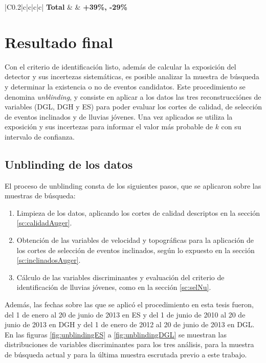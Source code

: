 \begin{table}[ht!]
\begin{tabular}{|C{0.2\textwidth}|c|c|c|c|}
		\hline
		\hline
		{\bf Total}                     &   {}  & {\bf +39\%, -29\%}         \\
		\hline
		\end{tabular}
		\caption{Resumen de las fuentes de error sistemático consideradas en este trabajo. Luego de obtener la estimación debida a cada fuebte para cada canal se combinaron utilizando la ecuación \ref{eq:sistErr03}, lo que se muestra en la última columna. Por último el error en la exposición total se obtuvo sumando en cuadratura los valores expuestos en la última columna.}
		\label{tab:sist}
	\end{table}

\chapter{Resultado final}
\label{ch:resAuger}
Con el criterio de identificaci\'on listo, adem\'as de calcular la exposici\'on del detector y sus incertezas sistem\'aticas, es posible analizar la muestra de b\'usqueda y determinar la existencia o no de eventos candidatos.
Este procedimiento se denomina \emph{unblinding}, y consiste en aplicar a los datos las tres reconstrucci\'ones de variables (DGL, DGH y ES) para poder evaluar los cortes de calidad, de selecci\'on de eventos inclinados y de lluvias j\'ovenes.
Una vez aplicados se utiliza la exposici\'on y sus incertezas para informar el valor m\'as probable de $k$ con su intervalo de confianza.
	
	\section{Unblinding de los datos}
	
	El proceso de unblinding consta de los siguientes pasos, que se aplicaron sobre las muestras de b\'usqueda:
	\begin{enumerate}
	 \item Limpieza de los datos, aplicando los cortes de calidad descriptos en la secci\'on \ref{sc:calidadAuger}.
	 \item Obtenci\'on de las variables de velocidad y topogr\'aficas para la aplicaci\'on de los cortes de selecci\'on de eventos inclinados, seg\'un lo expuesto en la secci\'on \ref{sc:inclinadosAuger}.
	 \item C\'alculo de las variables discriminantes y evaluaci\'on del criterio de identificaci\'on de lluvias j\'ovenes, como en la secci\'on \ref{sc:selNu}.
	\end{enumerate}
	Adem\'as, las fechas sobre las que se aplic\'o el procedimiento en esta tesis fueron, del 1 de enero al 20 de junio de 2013 en ES y del 1 de junio de 2010 al 20 de junio de 2013 en DGH y del 1 de enero de 2012 al 20 de junio de 2013 en DGL.
	En las figuras \ref{fig:unblindingES} a \ref{fig:unblindingDGL} se muestran las distribuciones de variables discriminantes para los tres an\'alisis, para la muestra de b\'usqueda actual y para la \'ultima muestra escrutada previo a este trabajo.
	
